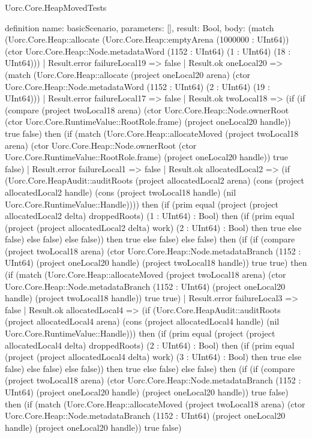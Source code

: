 \begin{lexlean}{Uorc.Core.HeapMovedTests}
\begin{semanticmodule}
definition{
  name: basicScenario,
  parameters: [],
  result: Bool,
  body: (match (Uorc.Core.Heap::allocate (Uorc.Core.Heap::emptyArena (1000000 : UInt64)) (ctor Uorc.Core.Heap::Node.metadataWord (1152 : UInt64) (1 : UInt64) (18 : UInt64)))
    | Result.error failureLocal19 => false
    | Result.ok oneLocal20 => (match (Uorc.Core.Heap::allocate (project oneLocal20 arena) (ctor Uorc.Core.Heap::Node.metadataWord (1152 : UInt64) (2 : UInt64) (19 : UInt64)))
      | Result.error failureLocal17 => false
      | Result.ok twoLocal18 => (if (if (compare (project twoLocal18 arena) (ctor Uorc.Core.Heap::Node.ownerRoot (ctor Uorc.Core.RuntimeValue::RootRole.frame) (project oneLocal20 handle)) true false) then (if (match (Uorc.Core.Heap::allocateMoved (project twoLocal18 arena) (ctor Uorc.Core.Heap::Node.ownerRoot (ctor Uorc.Core.RuntimeValue::RootRole.frame) (project oneLocal20 handle)) true false)
        | Result.error failureLocal1 => false
        | Result.ok allocatedLocal2 => (if (Uorc.Core.HeapAudit::auditRoots (project allocatedLocal2 arena) (cons (project allocatedLocal2 handle) (cons (project twoLocal18 handle) (nil Uorc.Core.RuntimeValue::Handle)))) then (if (prim equal (project (project allocatedLocal2 delta) droppedRoots) (1 : UInt64) : Bool) then (if (prim equal (project (project allocatedLocal2 delta) work) (2 : UInt64) : Bool) then true else false) else false) else false)) then true else false) else false) then (if (if (compare (project twoLocal18 arena) (ctor Uorc.Core.Heap::Node.metadataBranch (1152 : UInt64) (project oneLocal20 handle) (project twoLocal18 handle)) true true) then (if (match (Uorc.Core.Heap::allocateMoved (project twoLocal18 arena) (ctor Uorc.Core.Heap::Node.metadataBranch (1152 : UInt64) (project oneLocal20 handle) (project twoLocal18 handle)) true true)
        | Result.error failureLocal3 => false
        | Result.ok allocatedLocal4 => (if (Uorc.Core.HeapAudit::auditRoots (project allocatedLocal4 arena) (cons (project allocatedLocal4 handle) (nil Uorc.Core.RuntimeValue::Handle))) then (if (prim equal (project (project allocatedLocal4 delta) droppedRoots) (2 : UInt64) : Bool) then (if (prim equal (project (project allocatedLocal4 delta) work) (3 : UInt64) : Bool) then true else false) else false) else false)) then true else false) else false) then (if (if (compare (project twoLocal18 arena) (ctor Uorc.Core.Heap::Node.metadataBranch (1152 : UInt64) (project oneLocal20 handle) (project oneLocal20 handle)) true false) then (if (match (Uorc.Core.Heap::allocateMoved (project twoLocal18 arena) (ctor Uorc.Core.Heap::Node.metadataBranch (1152 : UInt64) (project oneLocal20 handle) (project oneLocal20 handle)) true false)
}
\end{semanticmodule}
\end{lexlean}
